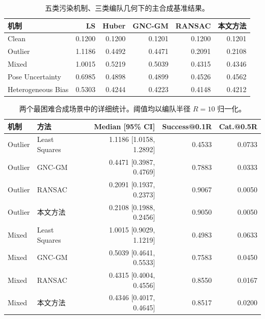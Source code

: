 \begin{table}[!htbp]
\centering
\caption{五类污染机制、三类编队几何下的主合成基准结果。}
\label{tab:mainregimes}
\begin{tabular}{lrrrrr}
\toprule
机制 & LS & Huber & GNC-GM & RANSAC & 本文方法 \\
\midrule
Clean                & 0.1200 & 0.1200 & 0.1201 & 0.1200 & 0.1201 \\
Outlier              & 1.1186 & 0.4492 & 0.4471 & 0.2091 & 0.2108 \\
Mixed                & 1.0015 & 0.5219 & 0.5039 & 0.4315 & 0.4346 \\
Pose Uncertainty     & 0.6985 & 0.4898 & 0.4899 & 0.4526 & 0.4562 \\
Heterogeneous Bias   & 0.5303 & 0.4244 & 0.4223 & 0.4148 & 0.4212 \\
\bottomrule
\end{tabular}
\end{table}

\begin{table}[!htbp]
\centering
\caption{两个最困难合成场景中的详细统计。阈值均以编队半径 $R=10$ 归一化。}
\label{tab:hardregimes}
\small
\begin{tabular}{llrrr}
\toprule
机制 & 方法 & Median [95\% CI] & Success@0.1R & Cat.@0.5R \\
\midrule
Outlier & Least Squares & 1.1186 [1.0158, 1.2892] & 0.4533 & 0.0733 \\
Outlier & GNC-GM        & 0.4471 [0.3987, 0.4769] & 0.7883 & 0.0333 \\
Outlier & RANSAC        & 0.2091 [0.1937, 0.2373] & 0.9067 & 0.0050 \\
Outlier & 本文方法       & 0.2108 [0.1988, 0.2456] & 0.9050 & 0.0050 \\
\midrule
Mixed   & Least Squares & 1.0015 [0.9029, 1.1219] & 0.4983 & 0.0633 \\
Mixed   & GNC-GM        & 0.5039 [0.4641, 0.5533] & 0.7583 & 0.0450 \\
Mixed   & RANSAC        & 0.4315 [0.4004, 0.4556] & 0.8550 & 0.0167 \\
Mixed   & 本文方法       & 0.4346 [0.4017, 0.4645] & 0.8517 & 0.0200 \\
\bottomrule
\end{tabular}
\end{table}
